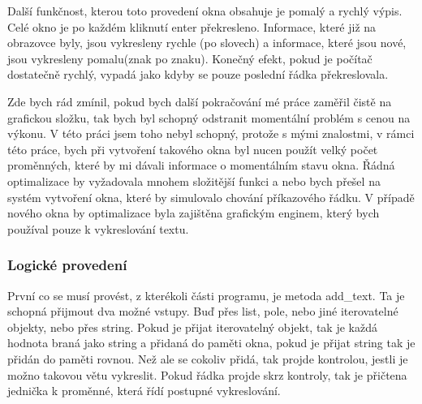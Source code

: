 \documentclass[12pt,a4paper]{article}
\begin{document}
Další funkčnost, kterou toto provedení okna obsahuje je pomalý a rychlý výpis. Celé okno je po každém kliknutí enter překresleno. Informace, které již na obrazovce byly, jsou vykresleny rychle (po slovech) a informace, které jsou nové, jsou vykresleny pomalu(znak po znaku). Konečný efekt, pokud je počítač dostatečně rychlý, vypadá jako kdyby se pouze poslední řádka překreslovala. 

Zde bych rád zmínil, pokud bych další pokračování mé práce zaměřil čistě na grafickou složku, tak bych byl schopný odstranit momentální problém s cenou na výkonu. V této práci jsem toho nebyl schopný, protože s mými znalostmi, v rámci této práce, bych při vytvoření takového okna byl nucen použít velký počet proměnných, které by mi dávali informace o momentálním stavu okna. Řádná optimalizace by vyžadovala mnohem složitější funkci a nebo bych přešel na systém vytvoření okna, které by simulovalo chování příkazového řádku. V případě nového okna by optimalizace byla zajištěna grafickým enginem, který bych používal pouze k vykreslování textu.
\subsubsection{Logické provedení}
První co se musí provést, z kterékoli části programu, je metoda add\_text. Ta je schopná přijmout dva možné vstupy. Buď přes list, pole, nebo jiné iterovatelné objekty, nebo přes string. Pokud je přijat iterovatelný objekt, tak je každá hodnota braná jako string a přidaná do paměti okna, pokud je přijat string tak je přidán do paměti rovnou. Než ale se cokoliv přidá, tak projde kontrolou, jestli je možno takovou větu vykreslit. Pokud řádka projde skrz kontroly, tak je přičtena jednička k proměnné, která řídí postupné vykreslování.
\end{document}
